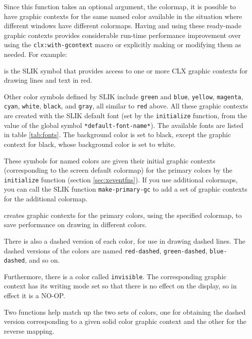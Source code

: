 \documentclass[twoside,openright,11pt]{report}
\newcommand{\tp}[1]{\texttt{#1}}
\begin{document}
Since this function takes an optional argument, the colormap, it is
possible to have graphic contexts for the same named color available
in the situation where different windows have different colormaps.
Having and using these ready-made graphic contexts provides
considerable run-time performance improvement over using the
\tp{clx:with-gcontext} macro or explicitly making or modifying them as
needed.  For example:

{is the SLIK symbol that provides access to one or more CLX graphic
contexts for drawing lines and text in red.}

Other color symbols defined by SLIK include \tp{green}
and \tp{blue}, \tp{yellow},
\tp{magenta}, \tp{cyan},
\tp{white}, \tp{black}, and
\tp{gray}, all similar to \tp{red} above.  All these
graphic contexts are created with the SLIK default font (set by the
\tp{initialize} function, from the value of the global symbol
\tp{*default-font-name*}).  The available fonts are listed in table
\ref{tab:fonts}.  The background color is set to black, except the
graphic context for black, whose background color is set to white.

These symbols for named colors are given their initial graphic
contexts (corresponding to the screen default colormap) for the
primary colors by the \tp{initialize} function (section
\ref{sec:xeventfns}).  If you use additional colormaps, you can call
the SLIK function \tp{make-primary-gc} to add a set of graphic
contexts for the additional colormap.

{creates graphic contexts for the primary colors, using the specified
colormap, to save performance on drawing in different colors.}

There is also a dashed version of each color, for use in drawing
dashed lines.  The dashed versions of the colors are named
\tp{red-dashed}, \tp{green-dashed}, \tp{blue-dashed}, and so
on.

Furthermore, there is a color called \tp{invisible}.
The corresponding graphic context has its writing mode set so that
there is no effect on the display, so in effect it is a NO-OP.

Two functions help match up the two sets of colors, one for obtaining
the dashed version corresponding to a given solid color graphic
context and the other for the reverse mapping.
\end{document}

